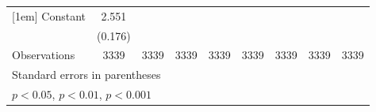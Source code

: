 \begin{table}[htbp]
\begin{tabular}{l*{8}{c}}
[1em]
Constant        &    2.551\sym{***}&                  &                  &                  &                  &                  &                  &                  \\
                &  (0.176)         &                  &                  &                  &                  &                  &                  &                  \\
\hline
Observations    &     3339         &     3339         &     3339         &     3339         &     3339         &     3339         &     3339         &     3339         \\
\hline\hline
\multicolumn{9}{l}{\footnotesize Standard errors in parentheses}\\
\multicolumn{9}{l}{\footnotesize \sym{*} \(p<0.05\), \sym{**} \(p<0.01\), \sym{***} \(p<0.001\)}\\
\end{tabular}
\end{table}
